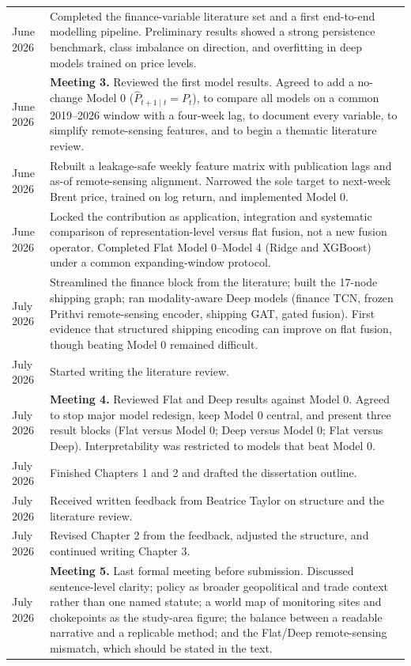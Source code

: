 \documentclass[
  british,
  12pt,
  oneside]{book}
\begin{document}
{{\begin{longtable}[]{@{}
  >{\raggedright\arraybackslash}p{}
  >{\raggedright\arraybackslash}p{}@{}}
16 June 2026 & Completed the finance-variable literature set and a first end-to-end modelling pipeline. Preliminary results showed a strong persistence benchmark, class imbalance on direction, and overfitting in deep models trained on price levels. \\
17 June 2026 & \textbf{Meeting 3.} Reviewed the first model results. Agreed to add a no-change Model 0 (\(\hat{P}_{t+1\mid t}=P_t\)), to compare all models on a common 2019--2026 window with a four-week lag, to document every variable, to simplify remote-sensing features, and to begin a thematic literature review. \\
22 June 2026 & Rebuilt a leakage-safe weekly feature matrix with publication lags and as-of remote-sensing alignment. Narrowed the sole target to next-week Brent price, trained on log return, and implemented Model 0. \\
30 June 2026 & Locked the contribution as application, integration and systematic comparison of representation-level versus flat fusion, not a new fusion operator. Completed Flat Model 0--Model 4 (Ridge and XGBoost) under a common expanding-window protocol. \\
3 July 2026 & Streamlined the finance block from the literature; built the 17-node shipping graph; ran modality-aware Deep models (finance TCN, frozen Prithvi remote-sensing encoder, shipping GAT, gated fusion). First evidence that structured shipping encoding can improve on flat fusion, though beating Model 0 remained difficult. \\
4 July 2026 & Started writing the literature review. \\
8 July 2026 & \textbf{Meeting 4.} Reviewed Flat and Deep results against Model 0. Agreed to stop major model redesign, keep Model 0 central, and present three result blocks (Flat versus Model 0; Deep versus Model 0; Flat versus Deep). Interpretability was restricted to models that beat Model 0. \\
15 July 2026 & Finished Chapters 1 and 2 and drafted the dissertation outline. \\
16 July 2026 & Received written feedback from Beatrice Taylor on structure and the literature review. \\
20 July 2026 & Revised Chapter 2 from the feedback, adjusted the structure, and continued writing Chapter 3. \\
29 July 2026 & \textbf{Meeting 5.} Last formal meeting before submission. Discussed sentence-level clarity; policy as broader geopolitical and trade context rather than one named statute; a world map of monitoring sites and chokepoints as the study-area figure; the balance between a readable narrative and a replicable method; and the Flat/Deep remote-sensing mismatch, which should be stated in the text. \\

\end{longtable}}}
\end{document}

